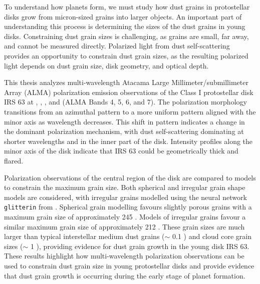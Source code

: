 

To understand how planets form, we must study how dust grains in protostellar disks grow from micron-sized grains into larger objects. An important part of understanding this process is determining the sizes of the dust grains in young disks. Constraining dust grain sizes is challenging, as grains are small, far away, and cannot be measured directly. Polarized light from dust self-scattering provides an opportunity to constrain dust grain sizes, as the resulting polarized light depends on dust grain size, disk geometry, and optical depth.  

This thesis analyzes multi-wavelength Atacama Large Millimeter/submillimeter Array (ALMA) polarization emission observations of the Class I protostellar disk IRS 63 at \bfourNS, \bfiveNS, \bsixNS, and \bseven (ALMA Bands 4, 5, 6, and 7). The polarization morphology transitions from an azimuthal pattern to a more uniform pattern aligned with the minor axis as wavelength decreases. This shift in pattern indicates a change in the dominant polarization mechanism, with dust self-scattering dominating at shorter wavelengths and in the inner part of the disk. Intensity profiles along the minor axis of the disk indicate that IRS 63 could be geometrically thick and flared.


Polarization observations of the central region of the disk are compared to models to constrain the maximum grain size. Both spherical and irregular grain shape models are considered, with irregular grains modelled using the neural network \texttt{glitterin} from \cite{Lin2024}. Spherical grain modelling favours slightly porous grains with a maximum grain size of approximately 245 \micronNS. Models of irregular grains favour a similar maximum grain size of approximately 212 \micronNS. These grain sizes are much larger than typical interstellar medium dust grains ($\sim$ 0.1 \micronNS) and cloud core grain sizes ($\sim$ 1 \micronNS), providing evidence for dust grain growth in the young disk IRS 63. These results highlight how multi-wavelength polarization observations can be used to constrain dust grain size in young protostellar disks and provide evidence that dust grain growth is occurring during the early stage of planet formation.
